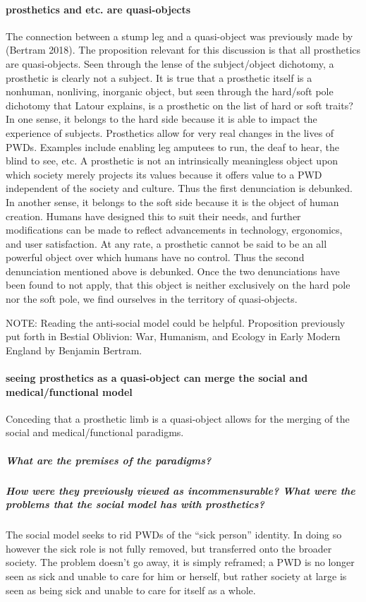 \documentclass{lps}
\begin{document}
\paragraph{prosthetics and etc. are quasi-objects}
The connection between a stump leg and a quasi-object was previously made by (Bertram 2018). The proposition relevant for this discussion is that all prosthetics are quasi-objects. Seen through the lense of the subject/object dichotomy, a prosthetic is clearly not a subject. It is true that a prosthetic itself is a nonhuman, nonliving, inorganic object, but seen through the hard/soft pole dichotomy that Latour explains, is a prosthetic on the list of hard or soft traits? 
In one sense, it belongs to the hard side because it is able to impact the experience of subjects. Prosthetics allow for very real changes in the lives of PWDs. Examples include enabling leg amputees to run, the deaf to hear, the blind to see, etc. A prosthetic is not an intrinsically meaningless object upon which society merely projects its values because it offers value to a PWD independent of the society and culture. Thus the first denunciation is debunked.
In another sense, it belongs to the soft side because it is the object of human creation. Humans have designed this to suit their needs, and further modifications can be made to reflect advancements in technology, ergonomics, and user satisfaction. At any rate, a prosthetic cannot be said to be an all powerful object over which humans have no control. Thus the second denunciation mentioned above is debunked.
Once the two denunciations have been found to not apply, that this object is neither exclusively on the hard pole nor the soft pole,  we find ourselves in the territory of quasi-objects.


NOTE:
Reading the anti-social model could be helpful.
Proposition previously put forth in Bestial Oblivion: War, Humanism, and Ecology in Early Modern England by Benjamin Bertram.

\paragraph{seeing prosthetics as a quasi-object can merge the social and
medical/functional model}

Conceding that a prosthetic limb is a quasi-object allows for the merging of the social and medical/functional paradigms. 
\subparagraph{What are the premises of the paradigms?}

\subparagraph{How were they previously viewed as incommensurable? What were
the problems that the social model has with prosthetics?}
The social model seeks to rid PWDs of the “sick person” identity. In doing so however the sick role is not fully removed, but transferred onto the broader society. The problem doesn’t go away, it is simply reframed; a PWD is no longer seen as sick and unable to care for him or herself, but rather society at large is seen as being sick and unable to care for itself as a whole.
\end{document}

